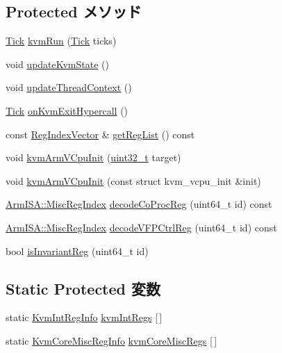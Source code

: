 \subsection*{Protected メソッド}
\begin{DoxyCompactItemize}
\item 
\hyperlink{base_2types_8hh_a5c8ed81b7d238c9083e1037ba6d61643}{Tick} \hyperlink{classArmKvmCPU_aed3dbd0c0bf26d82ee56367a3f350506}{kvmRun} (\hyperlink{base_2types_8hh_a5c8ed81b7d238c9083e1037ba6d61643}{Tick} ticks)
\item 
void \hyperlink{classArmKvmCPU_a93c6e8c82dfb63c7039f0cbf064fae5d}{updateKvmState} ()
\item 
void \hyperlink{classArmKvmCPU_adbd5e38eae7c8c3021f2c4f430b399fd}{updateThreadContext} ()
\item 
\hyperlink{base_2types_8hh_a5c8ed81b7d238c9083e1037ba6d61643}{Tick} \hyperlink{classArmKvmCPU_ac0b773030a2340b7bdac78ccc7227449}{onKvmExitHypercall} ()
\item 
const \hyperlink{classstd_1_1vector}{RegIndexVector} \& \hyperlink{classArmKvmCPU_ae852422eea452a5cdcf96e300ec91cc7}{getRegList} () const 
\item 
void \hyperlink{classArmKvmCPU_a2b5088861eb66dc69fc8dc2f39f6174e}{kvmArmVCpuInit} (\hyperlink{Type_8hh_a435d1572bf3f880d55459d9805097f62}{uint32\_\-t} target)
\item 
void \hyperlink{classArmKvmCPU_a019059b30bdbbd0e5b4a2e41794f5e57}{kvmArmVCpuInit} (const struct kvm\_\-vcpu\_\-init \&init)
\item 
\hyperlink{namespaceArmISA_a1e522017e015d4c7efd6b2360143aa67}{ArmISA::MiscRegIndex} \hyperlink{classArmKvmCPU_a9b185ea78411f18604ed826462d010d7}{decodeCoProcReg} (uint64\_\-t id) const 
\item 
\hyperlink{namespaceArmISA_a1e522017e015d4c7efd6b2360143aa67}{ArmISA::MiscRegIndex} \hyperlink{classArmKvmCPU_acf6fe05c1274f3c7d8d6b452f193522b}{decodeVFPCtrlReg} (uint64\_\-t id) const 
\item 
bool \hyperlink{classArmKvmCPU_a901923fcf22651d3f67b8c4e0874868f}{isInvariantReg} (uint64\_\-t id)
\end{DoxyCompactItemize}
\subsection*{Static Protected 変数}
\begin{DoxyCompactItemize}
\item 
static \hyperlink{structArmKvmCPU_1_1KvmIntRegInfo}{KvmIntRegInfo} \hyperlink{classArmKvmCPU_a610b9b2e17374a59cb14ab6e1b7c3dd0}{kvmIntRegs} \mbox{[}$\,$\mbox{]}
\item 
static \hyperlink{structArmKvmCPU_1_1KvmCoreMiscRegInfo}{KvmCoreMiscRegInfo} \hyperlink{classArmKvmCPU_a7f2a34be5f2a6e8b6812657f935461cf}{kvmCoreMiscRegs} \mbox{[}$\,$\mbox{]}
\end{DoxyCompactItemize}
